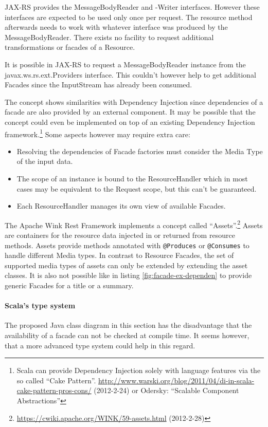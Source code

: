 \documentclass[12pt,a4paper,twoside]{scrartcl}		%
\newcommand{\citeurl}[2]{\url{#1} (#2)}
\begin{document}
JAX-RS provides the MessageBodyReader and -Writer interfaces. However these
interfaces are expected to be used only once per request. The resource method
afterwards needs to work with whatever interface was produced by the
MessageBodyReader. There exists no facility to request additional
transformations or facades of a Resource.

It is possible in JAX-RS to request a MessageBodyReader instance from the
javax.ws.rs.ext.Providers interface. This couldn't however help to get
additional Facades since the InputStream has already been consumed.

The concept shows similarities with Dependency Injection since dependencies of a
facade are also provided by an external component. It may be possible that the
concept could even be implemented on top of an existing Dependency Injection
framework.\footnote{Scala can provide Dependency Injection solely with language
  features via the so called ``Cake
  Pattern''. \citeurl{http://www.warski.org/blog/2011/04/di-in-scala-cake-pattern-pros-cons/}{2012-2-24}
  or Odersky: ``Scalable Component Abstractions''} Some aspects however may
require extra care:

\begin{itemize}
\item Resolving the dependencies of Facade factories must consider the Media
  Type of the input data.
\item The scope of an instance is bound to the ResourceHandler which in most
  cases may be equivalent to the Request scope, but this can't be guaranteed.
\item Each ResourceHandler manages its own view of available Facades.
\end{itemize}

The Apache Wink Rest Framework implements a concept called
``Assets''.\footnote{\citeurl{https://cwiki.apache.org/WINK/59-assets.html}{2012-2-28}}
Assets are containers for the resource data injected in or returned from
resource methods. Assets provide methods annotated with \lstinline:@Produces: or
\lstinline:@Consumes: to handle different Media types. In contrast to Resource
Facades, the set of supported media types of assets can only be extended by
extending the asset classes. It is also not possible like in listing
\ref{fig:facade-ex-dependen} to provide generic Facades for a title or a
summary.

\paragraph{Scala's type system}
The proposed Java class diagram in this section has the disadvantage that the
availability of a facade can not be checked at compile time. It seems however,
that a more advanced type system could help in this regard.
\end{document}
